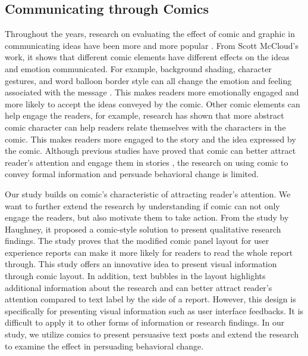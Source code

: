 \subsection{Communicating through Comics}
Throughout the years, research on evaluating the effect of comic and graphic in communicating ideas have been more and more popular \cite{McDermottPB18,cary2004going,scott1993understanding,weaver2017losing,matsubara2016emotional}. From Scott McCloud's work, it shows that different comic elements have different effects on the ideas and emotion communicated. For example, background shading, character gestures, and word balloon border style can all change the emotion and feeling associated with the message \cite{scott1993understanding,mccloud2011making}. This makes readers more emotionally engaged and more likely to accept the ideas conveyed by the comic. Other comic elements can help engage the readers, for example, research has shown that more abstract comic character can help readers relate themselves with the characters in the comic. This makes readers more engaged to the story and the idea expressed by the comic. Although previous studies have proved that comic can better attract reader's attention and engage them in stories \cite{scott1993understanding,mccloud2011making,McDermottPB18}, the research on using comic to convey formal information and persuade behavioral change is limited.\par
Our study builds on comic's characteristic of attracting reader's attention. We want to further extend the research by understanding if comic can not only engage the readers, but also motivate them to take action. From the study by Haughney, it proposed a comic-style solution to present qualitative research findings. The study proves that the modified comic panel layout for user experience reports can make it more likely for readers to read the whole report through\cite{haughney2008using}. This study offers an innovative idea to present visual information through comic layout. In addition, text bubbles in the layout highlights additional information about the research and can better attract reader's attention compared to text label by the side of a report. However, this design is specifically for presenting visual information such as user interface feedbacks. It is difficult to apply it to other forms of information or research findings. In our study, we utilize comics to present persuasive text posts and extend the research to examine the effect in persuading behavioral change.\par

